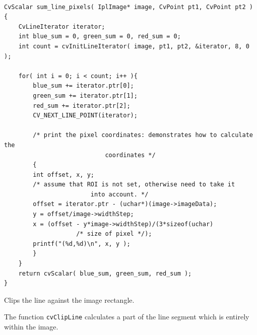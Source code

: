\begin{lstlisting}

CvScalar sum_line_pixels( IplImage* image, CvPoint pt1, CvPoint pt2 )
{
    CvLineIterator iterator;
    int blue_sum = 0, green_sum = 0, red_sum = 0;
    int count = cvInitLineIterator( image, pt1, pt2, &iterator, 8, 0 );

    for( int i = 0; i < count; i++ ){
        blue_sum += iterator.ptr[0];
        green_sum += iterator.ptr[1];
        red_sum += iterator.ptr[2];
        CV_NEXT_LINE_POINT(iterator);

        /* print the pixel coordinates: demonstrates how to calculate the 
							coordinates */
        {
        int offset, x, y;
        /* assume that ROI is not set, otherwise need to take it 
						into account. */
        offset = iterator.ptr - (uchar*)(image->imageData);
        y = offset/image->widthStep;
        x = (offset - y*image->widthStep)/(3*sizeof(uchar) 
					/* size of pixel */);
        printf("(%d,%d)\n", x, y );
        }
    }
    return cvScalar( blue_sum, green_sum, red_sum );
}

\end{lstlisting}
\fi

\label{ClipLine}

Clips the line against the image rectangle.


\begin{description}
\end{description}

The function \texttt{cvClipLine} calculates a part of the line
segment which is entirely within the image.

\ifC
{}\label{Ellipse2Poly}


